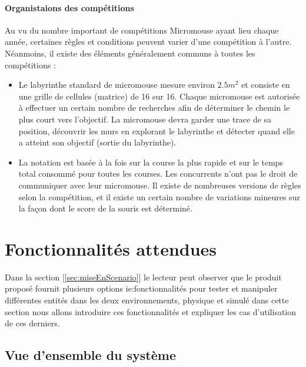 \paragraph{Organistaions des compétitions}
   Au vu du nombre important de compétitions Micromouse ayant lieu chaque année,
certaines règles et conditions peuvent varier d'une compétition à l'autre.
Néanmoins, il existe des éléments généralement communs à toutes les
compétitions : 
\\ 

\begin{itemize}

\item
   Le labyrinthe standard de micromouse mesure environ $2.5m^2$
et consiste en une grille de cellules (matrice) de 16 sur 16. Chaque micromouse
est autorisée à effectuer un certain nombre de recherches afin de déterminer le
chemin le plus court vers l'objectif.  La micromouse devra garder une trace de
sa position, découvrir les murs en explorant le labyrinthe et détecter quand
elle a atteint son objectif (sortie du labyrinthe). \\

\item
   La notation est basée à la fois sur la course la plus rapide et sur le temps
total consommé pour toutes les courses. Les concurrents n'ont pas le droit de
communiquer avec leur micromouse.  Il existe de nombreuses versions de règles
selon la compétition, et il existe un certain nombre de variations mineures sur
la façon dont le score de la souris est déterminé. \\

\end{itemize}


\clearpage
\section{Fonctionnalités attendues} \label{sec:foncAttendues}
   Dans la section [\ref{sec:miseEnScenario}] le lecteur peut observer que le
produit proposé fournit plusieurs options ie:fonctionnalités pour tester et
manipuler différentes entités dans les deux environnements, physique et
simulé dans cette section nous allons introduire ces fonctionnalités et
expliquer les cas d'utilisation de ces derniers.

\subsection{Vue d’ensemble du système} \label{sec:vueEns}

